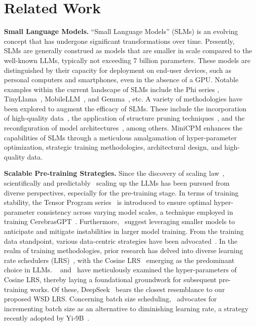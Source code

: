 \documentclass[dvipsnames]{article}
\begin{document}
\vspace{-5mm}
\section{Related Work}
\vspace{-2mm}
\textbf{Small Language Models.} ``Small Language Models'' (SLMs) is an evolving concept that has undergone significant transformations over time. Presently, SLMs are generally construed as models that are smaller in scale compared to the well-known LLMs, typically not exceeding 7 billion parameters. These models are distinguished by their capacity for deployment on end-user devices, such as personal computers and smartphones, even in the absence of a GPU. Notable examples within the current landscape of SLMs include the Phi series \citep{gunasekar2023textbooks, li2023textbooks, Javaheripi2023Phi2}, TinyLlama~\citep{zhang2024tinyllama}, MobileLLM~\citep{liu2024mobilellm}, and Gemma~\citep{Banks2024Gemma}, etc. 
A variety of methodologies have been explored to augment the efficacy of SLMs. These include the incorporation of high-quality data~\citep{gunasekar2023textbooks, li2023textbooks, Javaheripi2023Phi2}, the application of structure pruning techniques~\citep{xia2023sheared}, and the reconfiguration of model architectures~\citep{liu2024mobilellm}, among others. MiniCPM enhances the capabilities of SLMs through a meticulous amalgamation of hyper-parameter optimization, strategic training methodologies, architectural design, and high-quality data.

\textbf{Scalable Pre-training Strategies.} Since the discovery of scaling law~\citep{kaplan2020scaling, rae2021scaling, aghajanyan2023scaling}, scientifically and predictably~\citep{achiam2023gpt,hu2023unlock, du2024understanding} scaling up the LLMs has been pursued from diverse perspectives, especially for the pre-training stage. In terms of training stability, the Tensor Program series~\citep{yang2022tensor, yang2023tensor} is introduced to ensure optimal hyper-parameter consistency across varying model scales, a technique employed in training CerebrasGPT~\citep{dey2023cerebras}. Furthermore,~\cite{wortsman2023small} suggest leveraging smaller models to anticipate and mitigate instabilities in larger model training. From the training data standpoint, various data-centric strategies have been advocated~\citep{xie2024doremi, shi2023context, ye2024data}. In the realm of training methodologies, prior research has delved into diverse learning rate schedulers (LRS)~\citep{howard2018universal, raffel2020exploring, hundt2019sharpdarts}, with the Cosine LRS~\citep{loshchilov2016sgdr} emerging as the predominant choice in LLMs. ~\cite{kaplan2020scaling} and~\cite{hoffmann2022training} have meticulously examined the hyper-parameters of Cosine LRS, thereby laying a foundational groundwork for subsequent pre-training works. Of these, DeepSeek~\citep{bi2024deepseek} bears the closest resemblance to our proposed WSD LRS. Concerning batch size scheduling,~\cite{smith2017don} advocates for incrementing batch size as an alternative to diminishing learning rate, a strategy recently adopted by Yi-9B~\citep{young2024yi}.
\end{document}
